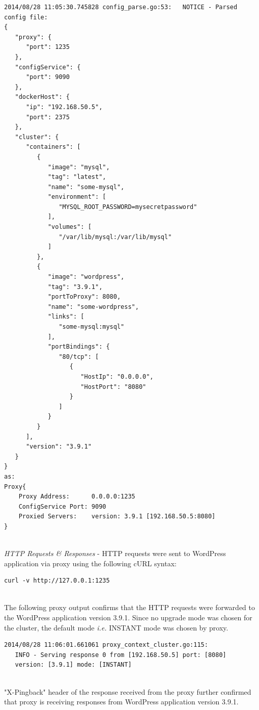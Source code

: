 \documentclass[a4paper,11pt,twoside]{report}
\begin{document}
\begin{lstlisting}[language=terminal]
2014/08/28 11:05:30.745828 config_parse.go:53:   NOTICE - Parsed config file:
{
   "proxy": {
      "port": 1235
   },
   "configService": {
      "port": 9090
   },
   "dockerHost": {
      "ip": "192.168.50.5",
      "port": 2375
   },
   "cluster": {
      "containers": [
         {
            "image": "mysql",
            "tag": "latest",
            "name": "some-mysql",
            "environment": [
               "MYSQL_ROOT_PASSWORD=mysecretpassword"
            ],
            "volumes": [
               "/var/lib/mysql:/var/lib/mysql"
            ]
         },
         {
            "image": "wordpress",
            "tag": "3.9.1",
            "portToProxy": 8080,
            "name": "some-wordpress",
            "links": [
               "some-mysql:mysql"
            ],
            "portBindings": {
               "80/tcp": [
                  {
                     "HostIp": "0.0.0.0",
                     "HostPort": "8080"
                  }
               ]
            }
         }
      ],
      "version": "3.9.1"
   }
}
as:
Proxy{
	Proxy Address:      0.0.0.0:1235
	ConfigService Port: 9090
	Proxied Servers:    version: 3.9.1 [192.168.50.5:8080]
}
\end{lstlisting}

\noindent\\
\textit{HTTP Requests \& Responses} - HTTP requests were sent to WordPress application via proxy using the following cURL syntax:\smallskip

\begin{lstlisting}[language=terminal]
curl -v http://127.0.0.1:1235
\end{lstlisting}

\noindent\\
The following proxy output confirms that the HTTP requests were forwarded to the WordPress application version 3.9.1. Since no upgrade mode was chosen for the cluster, the default mode \textit{i.e.} INSTANT mode was chosen by proxy. \smallskip

\begin{lstlisting}[language=terminal]
2014/08/28 11:06:01.661061 proxy_context_cluster.go:115:     
   INFO - Serving response 0 from [192.168.50.5] port: [8080] 
   version: [3.9.1] mode: [INSTANT]
\end{lstlisting}

\noindent\\
"X-Pingback" header of the response received from the proxy further confirmed that proxy is receiving responses from WordPress application version 3.9.1.\smallskip 
\end{document}
